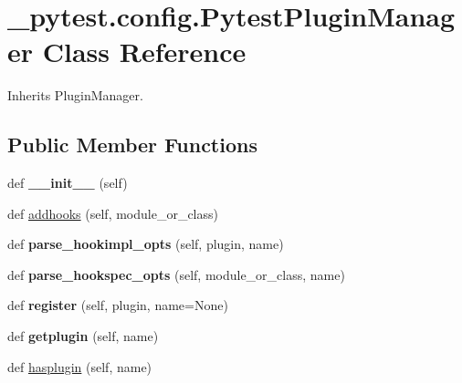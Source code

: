 \hypertarget{class__pytest_1_1config_1_1_pytest_plugin_manager}{}\section{\+\_\+pytest.\+config.\+Pytest\+Plugin\+Manager Class Reference}
\label{class__pytest_1_1config_1_1_pytest_plugin_manager}


Inherits Plugin\+Manager.

\subsection*{Public Member Functions}
\begin{DoxyCompactItemize}
\item 
\mbox{\label{class__pytest_1_1config_1_1_pytest_plugin_manager_a1530a175c4ca3c4c58740ddb3838b409}} 
def {\bfseries \+\_\+\+\_\+init\+\_\+\+\_\+} (self)
\item 
def \hyperlink{class__pytest_1_1config_1_1_pytest_plugin_manager_a2f8dbbdb244922fa7a8e9cab22b2c7e5}{addhooks} (self, module\+\_\+or\+\_\+class)
\item 
\mbox{\label{class__pytest_1_1config_1_1_pytest_plugin_manager_a8dfb781bf0dac56ee36b67dd625a8f9c}} 
def {\bfseries parse\+\_\+hookimpl\+\_\+opts} (self, plugin, name)
\item 
\mbox{\label{class__pytest_1_1config_1_1_pytest_plugin_manager_ab1ed76c7a02db2a561627ca2f87c88b1}} 
def {\bfseries parse\+\_\+hookspec\+\_\+opts} (self, module\+\_\+or\+\_\+class, name)
\item 
\mbox{\label{class__pytest_1_1config_1_1_pytest_plugin_manager_acc2a54d80ce2fca812e6fb524797faee}} 
def {\bfseries register} (self, plugin, name=None)
\item 
\mbox{\label{class__pytest_1_1config_1_1_pytest_plugin_manager_a227b7cc081a23d12bada485cc86bbd21}} 
def {\bfseries getplugin} (self, name)
\item 
def \hyperlink{class__pytest_1_1config_1_1_pytest_plugin_manager_a4d3df6b285ba52ee06aa2009d7b94077}{hasplugin} (self, name)

\end{DoxyCompactItemize}
